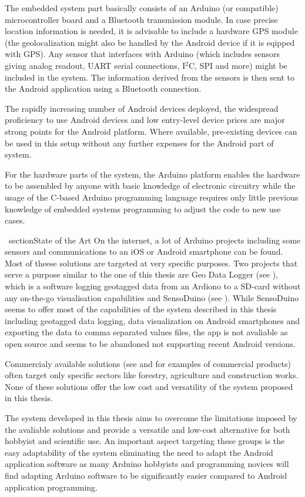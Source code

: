 The embedded system part basically consists of an Arduino (or compatible) microcontroller board and a Bluetooth transmission module. In case precise location information is needed, it is advisable to include a hardware GPS module (the geolocalization might also be handled by the Android device if it is eqipped with GPS). Any sensor that interfaces with Arduino (which includes sensors giving analog readout, UART serial connections, I$^2$C, SPI and more) might be included in the system. The information derived from the sensors is then sent to the Android application using a Bluetooth connection.

The rapidly increasing number of Android devices deployed, the widespread proficiency to use Android devices and low entry-level device prices are major strong points for the Android platform. Where available, pre-existing devices can be used in this setup without any further expenses for the Android part of system.

For the hardware parts of the system, the Arduino platform enables the hardware to be assembled by anyone with basic knowledge of electronic circuitry while the usage of the C-based Arduino programming language requires only little previous knowledge of embedded systems programming to adjust the code to new use cases.

\ section{State of the Art}
On the internet, a lot of Arduino projects including some sensors and communications to an iOS or Android smartphone can be found. Most of theese solutions are targeted at very specific purposes. Two projects that serve a purpose similar to the one of this thesis are Geo Data Logger (see \cite{gdl}), which is a software logging geotagged data from an Ardiono to a SD-card without any on-the-go visualisation capabilities and SensoDuino (see \cite{sensoduino}). While SensoDuino seems to offer most of the capabilities of the system described in this thesis including geotagged data logging, data visualization on Android smartphones and exporting the data to comma separated values files, the app is not avaliable as open source and seems to be abandoned not supporting recent Android versions. 

Commercialy available solutions (see \cite{mfEDV} and \cite{topcon} for examples of commercial products) often target only specific sectors like forestry, agriculture and construction works. None of these solutions offer the low cost and versatility of the system proposed in this thesis.


The system developed in this thesis aims to overcome the limitations imposed by the avaliable solutions and provide a versatile and low-cost alternative for both hobbyist and scientific use. An important aspect targeting these groups is the easy adaptability of the system eliminating the need to adapt the Android application software as many Arduino hobbyists and programming novices will find adapting Arduino software to be significantly easier compared to Android application programming.